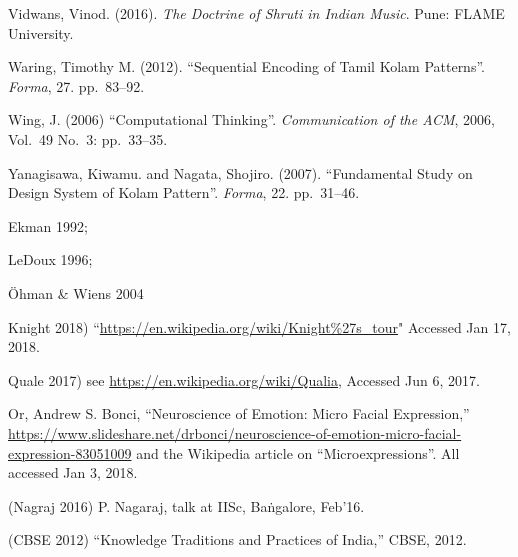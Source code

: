 \begin{thebibliography}{99}
Vidwans, Vinod. (2016). \textsl{The Doctrine of Shruti in Indian Music}. Pune: FLAME University.

Waring, Timothy M. (2012). “Sequential Encoding of Tamil Kolam Patterns”. \textsl{Forma}, 27. pp.~83--92.

Wing, J. (2006) “Computational Thinking”. \textsl{Communication of the ACM}, 2006, Vol.~49 No.~3: pp.~33--35.

Yanagisawa, Kiwamu. and Nagata, Shojiro. (2007). “Fundamental Study on Design System of Kolam Pattern”. \textsl{Forma}, 22. pp.~31--46.

Ekman 1992;

LeDoux 1996;

Öhman \& Wiens 2004

Knight 2018) “\url{https://en.wikipedia.org/wiki/Knight%27s_tour}" 
Accessed Jan 17, 2018.

Quale 2017) see \url{https://en.wikipedia.org/wiki/Qualia}, Accessed Jun 6, 2017.

Or, Andrew S. Bonci, “Neuroscience of Emotion: Micro Facial Expression,” \url{https://www.slideshare.net/drbonci/neuroscience-of-emotion-micro-facial-expression-83051009} and the Wikipedia article on “Microexpressions”. All accessed Jan 3, 2018.

(Nagraj 2016) P. Nagaraj, talk at IISc, Baṅgalore, Feb’16.

(CBSE 2012) “Knowledge Traditions and Practices of India,” CBSE, 2012.

\end{thebibliography}

\theendnotes
